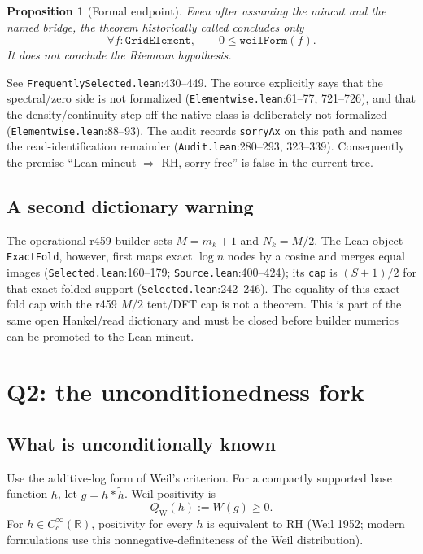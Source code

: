 \documentclass[11pt]{article}
\newtheorem{prop}{Proposition}
\newcommand{\QW}{Q_{\mathrm W}}
\begin{document}
\begin{prop}[Formal endpoint]\label{prop:endpoint}
Even after assuming the mincut and the named bridge, the theorem
historically called  concludes
only
\[
 \forall f:\texttt{GridElement},\qquad
 0\le\texttt{weilForm}(f).
\]
It does not conclude the Riemann hypothesis.
\end{prop}

\noindent
See \texttt{FrequentlySelected.lean}:430--449.
The source explicitly says that the spectral/zero side is not
formalized (\texttt{Elementwise.lean}:61--77, 721--726), and that
the density/continuity step off the native class is deliberately
not formalized (\texttt{Elementwise.lean}:88--93).
The audit records \texttt{sorryAx} on this path and names the
read-identification remainder
(\texttt{Audit.lean}:280--293, 323--339).
Consequently the premise ``Lean mincut $\Rightarrow$ RH,
sorry-free'' is false in the current tree.

\subsection{A second dictionary warning}

The operational r459 builder sets
$M=m_k+1$ and $N_k=M/2$.
The Lean object \texttt{ExactFold}, however, first maps exact
$\log n$ nodes by a cosine and merges equal images
(\texttt{Selected.lean}:160--179;
\texttt{Source.lean}:400--424); its \texttt{cap} is
$(S+1)/2$ for that exact folded support
(\texttt{Selected.lean}:242--246).
The equality of this exact-fold cap with the r459
$M/2$ tent/DFT cap is not a theorem.
This is part of the same open Hankel/read dictionary and must be
closed before builder numerics can be promoted to the Lean mincut.

\section{Q2: the unconditionedness fork}

\subsection{What is unconditionally known}

Use the additive-log form of Weil's criterion.  For a compactly
supported base function $h$, let
$g=h*\widetilde h$.  Weil positivity is
\[
 \QW(h):=W(g)\ge0.
\]
For $h\in C_c^\infty(\mathbb R)$, positivity for every $h$ is
equivalent to RH (Weil 1952; modern formulations use this
nonnegative-definiteness of the Weil distribution).
\end{document}
